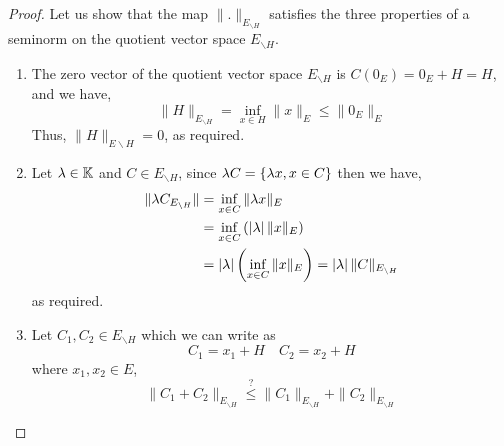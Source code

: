 \begin{proof}
Let us show that the map $\|. \| _{E _{ \backslash H}} $
satisfies the three properties of 
a seminorm on the quotient vector space $E_{ \backslash H}$.
\begin{enumerate}
\item The zero vector of the quotient vector space $E _{ \backslash H} $  
	is $C(0_{E}) = 0_{E} + H = H  $, and we have, 
	\[
	\| H \| _{E _{ \backslash H}} = 
	\inf_{x \in  H}  \| x \| _{E} \leq     
	\| 0_{E} \|_{E} 
	\]
	Thus, $\| H \| _{E \backslash H} = 0 $, as required.
\item Let $\lambda \in  \mathbb{K} $   and $C \in  E_{ \backslash H} $, 
	since $\lambda C = \left\{ \lambda x, x \in  C \right\} $ then we have, 
	\begin{align*}
		\| \lambda C_{E_{ \backslash H}} \|  &= 
		\inf_{x \in  C}  \| \lambda x \| _{E} \\
						 &= 
			\inf_{x \in  C}  \left( 
				\left| \lambda \right| 
				\| x \|_{E} 
			\right) \\
			 &= \left| \lambda \right| 
			 \left( \inf_{x \in  C} 
				 \| x \|_{E} 
			  \right) = 
			  \left| \lambda \right| 
			  \| C \|_{E_{ \backslash H}} 
	\end{align*}
	as required.
\item Let $C_1, C_2 \in  E_{ \backslash H} $   
	which we can write as 
	\[
	C_1 = x_1 + H \quad 
	C_2 = x_2 + H
	\]
	where $x_1, x_2 \in E $,
	\[
	\| C_1 + C_2 \|  _{E _{ \backslash H}} 
	\overset{?}{ \leq }  
	\| C_1 \| _{E _{ \backslash H}} + 
	\| C_2 \| _{E _{ \backslash H}}
	\]




\end{enumerate}
\end{proof}
